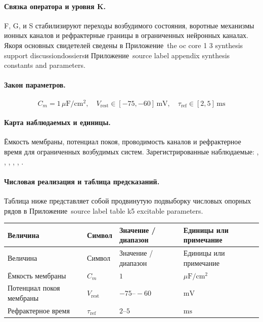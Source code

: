 \paragraph{Связка оператора и уровня K.}
F, G, и S стабилизируют переходы возбудимого состояния, воротные механизмы ионных каналов и рефрактерные границы в ограниченных нейронных каналах.
Якоря основных свидетелей сведены в Приложение~the oc core 1 3 synthesis support discussiondossiersи Приложение~source label appendix synthesis constants and parameters.

\paragraph{Закон параметров.}
\[
C_m = 1\,\mu\mathrm{F/cm^2},\quad V_{\mathrm{rest}} \in [-75,-60]\,\mathrm{mV},\quad \tau_{\mathrm{ref}} \in [2,5]\,\mathrm{ms}
\]

\paragraph{Карта наблюдаемых и единицы.}
Ёмкость мембраны, потенциал покоя, проводимость каналов и рефрактерное время для ограниченных возбудимых систем.
Зарегистрированные наблюдаемые: , \allowbreak {}, \allowbreak {}, \allowbreak {}, \allowbreak {}, \allowbreak {}.

\paragraph{Числовая реализация и таблица предсказаний.}
Таблица ниже представляет собой продвинутую подвыборку числовых опорных рядов в Приложение~source label table k5 excitable parameters.
\begin{longtable}{@{}L{0.27\textwidth}L{0.15\textwidth}L{0.24\textwidth}L{0.16\textwidth}@{}}
\toprule
Величина & Символ & Значение / диапазон & Единицы или примечание \\
\midrule
\endfirsthead
\toprule
Величина & Символ & Значение / диапазон & Единицы или примечание \\
\midrule
\endhead
Ёмкость мембраны & $\scriptstyle C_m$ & $1$ & $\mu\mathrm{F/cm^2}$ \\
Потенциал покоя мембраны & $\scriptstyle V_{\mathrm{rest}}$ & $-75\text{--}-60$ & $\mathrm{mV}$ \\
Рефрактерное время & $\scriptstyle \tau_{\mathrm{ref}}$ & $2\text{--}5$ & $\mathrm{ms}$ \\
\bottomrule
\end{longtable}


